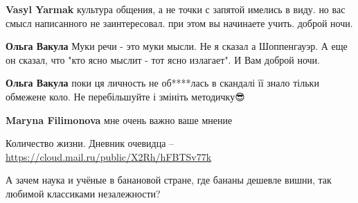 \begin{itemize}
\begin{itemize}
 
\textbf{Vasyl Yarmak} культура общения, а не точки с запятой имелись в виду. но вас смысл написанного не заинтересовал. при этом вы начинаете учить. доброй ночи.

 
\textbf{Ольга Вакула} Муки речи - это муки мысли. Не я сказал а Шоппенгауэр. А еще он сказал, что "кто ясно мыслит - тот ясно излагает".
И Вам доброй ночи.

 
\textbf{Ольга Вакула} поки ця личность не об****лась в скандалі її знало тільки обмежене коло. Не перебільшуйте і змініть методичку😎

 
\textbf{Maryna Filimonova} мне очень важно ваше мнение

\end{itemize}

 
Количество жизни. Дневник очевидца – \url{https://cloud.mail.ru/public/X2Rh/hFBTSv77k}

 

А зачем наука и учёные в банановой стране, где бананы дешевле вишни, так
любимой классиками незалежности?


\end{itemize}
